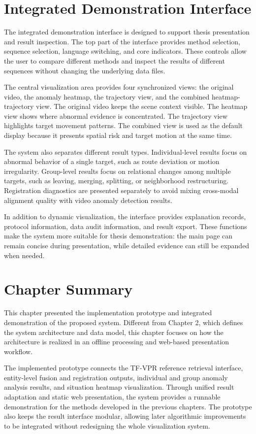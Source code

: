 \section{Integrated Demonstration Interface}
The integrated demonstration interface is designed to support thesis presentation and result inspection. The top part of the interface provides method selection, sequence selection, language switching, and core indicators. These controls allow the user to compare different methods and inspect the results of different sequences without changing the underlying data files.

The central visualization area provides four synchronized views: the original video, the anomaly heatmap, the trajectory view, and the combined heatmap-trajectory view. The original video keeps the scene context visible. The heatmap view shows where abnormal evidence is concentrated. The trajectory view highlights target movement patterns. The combined view is used as the default display because it presents spatial risk and target motion at the same time.

The system also separates different result types. Individual-level results focus on abnormal behavior of a single target, such as route deviation or motion irregularity. Group-level results focus on relational changes among multiple targets, such as leaving, merging, splitting, or neighborhood restructuring. Registration diagnostics are presented separately to avoid mixing cross-modal alignment quality with video anomaly detection results.

In addition to dynamic visualization, the interface provides explanation records, protocol information, data audit information, and result export. These functions make the system more suitable for thesis demonstration: the main page can remain concise during presentation, while detailed evidence can still be expanded when needed.

\section{Chapter Summary}
This chapter presented the implementation prototype and integrated demonstration of the proposed system. Different from Chapter 2, which defines the system architecture and data model, this chapter focuses on how the architecture is realized in an offline processing and web-based presentation workflow.

The implemented prototype connects the TF-VPR reference retrieval interface, entity-level fusion and registration outputs, individual and group anomaly analysis results, and situation heatmap visualization. Through unified result adaptation and static web presentation, the system provides a runnable demonstration for the methods developed in the previous chapters. The prototype also keeps the result interface modular, allowing later algorithmic improvements to be integrated without redesigning the whole visualization system.
